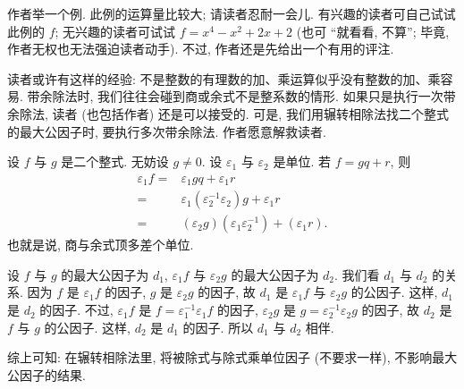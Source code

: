作者举一个例. 此例的运算量比较大; 请读者忍耐一会儿. 有兴趣的读者可自己试试此例的 $f$; 无兴趣的读者可试试 $f = x^4-x^2+2 x+2$ (也可 ``就看看, 不算''; 毕竟, 作者无权也无法强迫读者动手). 不过, 作者还是先给出一个有用的评注.

\begin{remark}
    读者或许有这样的经验: 不是整数的有理数的加、乘运算似乎没有整数的加、乘容易. 带余除法时, 我们往往会碰到商或余式不是整系数的情形. 如果只是执行一次带余除法, 读者 (也包括作者) 还是可以接受的. 可是, 我们用辗转相除法找二个整式的最大公因子时, 要执行多次带余除法. 作者愿意解救读者.

    设 $f$ 与 $g$ 是二个整式. 无妨设 $g \neq 0$. 设 $\varepsilon_1$ 与 $\varepsilon_2$ 是单位. 若 $f = gq + r$, 则
    \begin{align*}
        \varepsilon_1 f
        = {} & \varepsilon_1 gq + \varepsilon_1 r                                        \\
        = {} & \varepsilon_1 (\varepsilon_2^{-1} \varepsilon_2) g + \varepsilon_1 r      \\
        = {} & (\varepsilon_2 g) (\varepsilon_1 \varepsilon_2^{-1}) + (\varepsilon_1 r).
    \end{align*}
    也就是说, 商与余式顶多差个单位.

    设 $f$ 与 $g$ 的最大公因子为 $d_1$, $\varepsilon_1 f$ 与 $\varepsilon_2 g$ 的最大公因子为 $d_2$. 我们看 $d_1$ 与 $d_2$ 的关系. 因为 $f$ 是 $\varepsilon_1 f$ 的因子, $g$ 是 $\varepsilon_2 g$ 的因子, 故 $d_1$ 是 $\varepsilon_1 f$ 与 $\varepsilon_2 g$ 的公因子. 这样, $d_1$ 是 $d_2$ 的因子. 不过, $\varepsilon_1 f$ 是 $f = \varepsilon_1^{-1} \varepsilon_1 f$ 的因子, $\varepsilon_2 g$ 是 $g = \varepsilon_2^{-1} \varepsilon_2 g$ 的因子, 故 $d_2$ 是 $f$ 与 $g$ 的公因子. 这样, $d_2$ 是 $d_1$ 的因子. 所以 $d_1$ 与 $d_2$ 相伴.

    综上可知: 在辗转相除法里, 将被除式与除式乘单位因子 (不要求一样), 不影响最大公因子的结果.
\end{remark}

